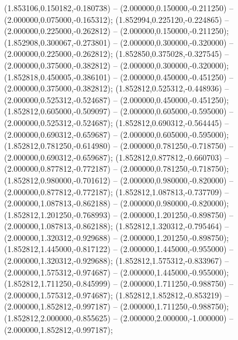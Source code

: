  (1.853106,0.150182,-0.180738) -- (2.000000,0.150000,-0.211250) -- (2.000000,0.075000,-0.165312);
 (1.852994,0.225120,-0.224865) -- (2.000000,0.225000,-0.262812) -- (2.000000,0.150000,-0.211250);
 (1.852908,0.300067,-0.273801) -- (2.000000,0.300000,-0.320000) -- (2.000000,0.225000,-0.262812);
 (1.852850,0.375028,-0.327545) -- (2.000000,0.375000,-0.382812) -- (2.000000,0.300000,-0.320000);
 (1.852818,0.450005,-0.386101) -- (2.000000,0.450000,-0.451250) -- (2.000000,0.375000,-0.382812);
 (1.852812,0.525312,-0.448936) -- (2.000000,0.525312,-0.524687) -- (2.000000,0.450000,-0.451250);
 (1.852812,0.605000,-0.509097) -- (2.000000,0.605000,-0.595000) -- (2.000000,0.525312,-0.524687);
 (1.852812,0.690312,-0.564445) -- (2.000000,0.690312,-0.659687) -- (2.000000,0.605000,-0.595000);
 (1.852812,0.781250,-0.614980) -- (2.000000,0.781250,-0.718750) -- (2.000000,0.690312,-0.659687);
 (1.852812,0.877812,-0.660703) -- (2.000000,0.877812,-0.772187) -- (2.000000,0.781250,-0.718750);
 (1.852812,0.980000,-0.701612) -- (2.000000,0.980000,-0.820000) -- (2.000000,0.877812,-0.772187);
 (1.852812,1.087813,-0.737709) -- (2.000000,1.087813,-0.862188) -- (2.000000,0.980000,-0.820000);
 (1.852812,1.201250,-0.768993) -- (2.000000,1.201250,-0.898750) -- (2.000000,1.087813,-0.862188);
 (1.852812,1.320312,-0.795464) -- (2.000000,1.320312,-0.929688) -- (2.000000,1.201250,-0.898750);
 (1.852812,1.445000,-0.817122) -- (2.000000,1.445000,-0.955000) -- (2.000000,1.320312,-0.929688);
 (1.852812,1.575312,-0.833967) -- (2.000000,1.575312,-0.974687) -- (2.000000,1.445000,-0.955000);
 (1.852812,1.711250,-0.845999) -- (2.000000,1.711250,-0.988750) -- (2.000000,1.575312,-0.974687);
 (1.852812,1.852812,-0.853219) -- (2.000000,1.852812,-0.997187) -- (2.000000,1.711250,-0.988750);
 (1.852812,2.000000,-0.855625) -- (2.000000,2.000000,-1.000000) -- (2.000000,1.852812,-0.997187);
